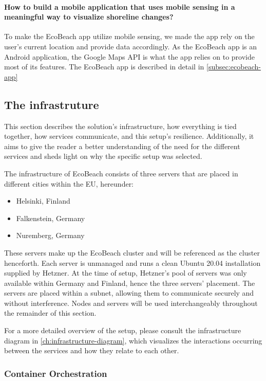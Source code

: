 \paragraph{How to build a mobile application that uses mobile sensing in a meaningful way to visualize shoreline changes?} To make the EcoBeach app utilize mobile sensing, we made the app rely on the user's current location and provide data accordingly. As the EcoBeach app is an Android application, the Google Maps API is what the app relies on to provide most of its features. The EcoBeach app is described in detail in \autoref{subsec:ecobeach-app}

\subsection{The infrastruture}\label{subsec:the-infrastructure}

This section describes the solution's infrastructure, how everything is tied together, how services communicate, and this setup's resilience. Additionally, it aims to give the reader a better understanding of the need for the different services and sheds light on why the specific setup was selected. 

The infrastructure of EcoBeach consists of three servers that are placed in different cities within the EU, hereunder: 

\begin{itemize}
    \item Helsinki, Finland
    \item Falkenstein, Germany
    \item Nuremberg, Germany
\end{itemize}


These servers make up the EcoBeach cluster and will be referenced as the cluster henceforth. Each server is unmanaged and runs a clean Ubuntu 20.04 installation supplied by Hetzner. At the time of setup, Hetzner's pool of servers was only available within Germany and Finland, hence the three servers' placement. The servers are placed within a subnet, allowing them to communicate securely and without interference. 
Nodes and servers will be used interchangeably throughout the remainder of this section. 

For a more detailed overview of the setup, please consult the infrastructure diagram in \autoref{ch:infrastructure-diagram}, which visualizes the interactions occurring between the services and how they relate to each other.

\subsubsection{Container Orchestration}

